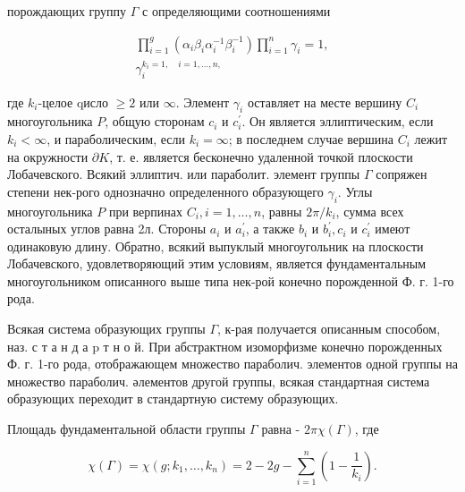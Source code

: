 \documentclass[10pt]{article}
\begin{document}
порождающих группу $\Gamma$ с определяющими соотношениями



\[

\begin{gathered}

\prod_{i=1}^{g}\left(\alpha_{i} \beta_{i} \alpha_{i}^{-1} \beta_{i}^{-1}\right) \prod_{i=1}^{n} \gamma_{i}=1, \\

\gamma_{i}^{k_{i}=1, \quad i=1, \ldots, n,}

\end{gathered}

\]



где $k_{i}$-целое qисло $\geqslant 2$ или $\infty$. Элемент $\gamma_{i}$ оставляет на месте вершину $C_{i}$ многоугольника $P$, общую сторонам $c_{i}$ и $c_{i}^{\prime}$. Он является эллиптическим, если $k_{i}<\infty$, и параболическим, если $k_{i}=\infty$; в последнем случае вершина $C_{i}$ лежит на окружности $\partial K$, т. е. является бесконечно удаленной точкой плоскости Лобачевского. Всякий эллиптич. или параболит. элемент группы $\Gamma$ сопряжен степени нек-рого однозначно определенного образующего $\gamma_{i}$. Углы многоугольника $P$ при верпинах $C_{i}, i=1, \ldots, n$, равны $2 \pi / k_{i}$, сумма всех осталыных углов равна 2л. Стороны $a_{i}$ и $a_{i}^{\prime}$, а также $b_{i}$ и $b_{i}^{\prime}, c_{i}$ и $c_{i}^{\prime}$ имеют одинаковую длину. Обратно, всякий выпуклый многоугольник на плоскости Лобачевского, удовлетворяющий этим условиям, является фундаментальным многоугольником описанного выше типа нек-рой конечно порожденной Ф. г. 1-го рода.



Всякая система образующих группы $\Gamma$, к-рая получается описанным способом, наз. с т а н д а $\mathrm{p}$ т н о й. При абстрактном изоморфизме конечно порожденных Ф. г. 1-го рода, отображающем множество параболич. элементов одной группы на множество параболич. әлементов другой группы, всякая стандартная система образующих переходит в стандартную систему образующих.



Площадь фундаментальной области группы $\Gamma$ равна - $2 \pi \chi(\Gamma)$, где



\[

\chi(\Gamma)=\chi\left(g ; k_{1}, \ldots, k_{n}\right)=2-2 g-\sum_{i=1}^{n}\left(1-\frac{1}{k_{i}}\right) .

\]
\end{document}
